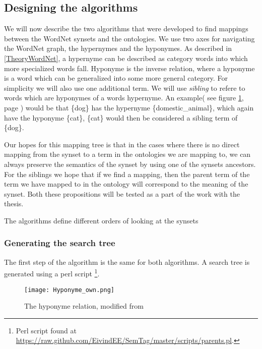 \subsection{Designing the algorithms}
We will now describe the two algorithms that were developed to find mappings between the WordNet synsets and the ontologies.
We use two axes for navigating the WordNet graph, the hypernymes and the hyponymes.
As described in \ref{TheoryWordNet}, a hypernyme can be described as category words into which more specialized words fall.
Hyponyme is the inverse relation, where a hyponyme is a word which can be generalized into some more general category.
For simplicity we will also use one additional term.
We will use \emph{sibling} to refere to words which are hyponymes of a words hypernyme.
An example( see figure \ref{Hyponyme}, page \pageref{Hyponyme})
would be that \{dog\} has the hypernyme \{domestic\_animal\}, which again have the hyponyme \{cat\},
\{cat\} would then be considered a sibling term of \{dog\}.


Our hopes for this mapping tree is that in the cases where there is no direct mapping from the synset to a term in the
ontologies we are mapping to, we can always preserve the semantics of the synset by using one of the synsets ancestors.
For the siblings we hope that if we find a mapping,
then the parent term of the term we have mapped to in the ontology will correspond to the meaning of the synset.
Both these propositions will be tested as a part of the work with the thesis.

The algorithms define different orders of looking at the synsets

\subsubsection{Generating the search tree}
The first step of the algorithm is the same for both algorithms.
A search tree is generated using a perl script
\footnote{Perl script found at \url{https://raw.github.com/EivindEE/SemTag/master/scripts/parents.pl}.}.

\begin{figure}[h]
    \begin{center}
        \texttt{[image: Hyponyme\_own.png]}
        \caption{The hyponyme relation, modified from \protect \citet{Miller1990}}
        \label{Hyponyme}
    \end{center}
\end{figure}



